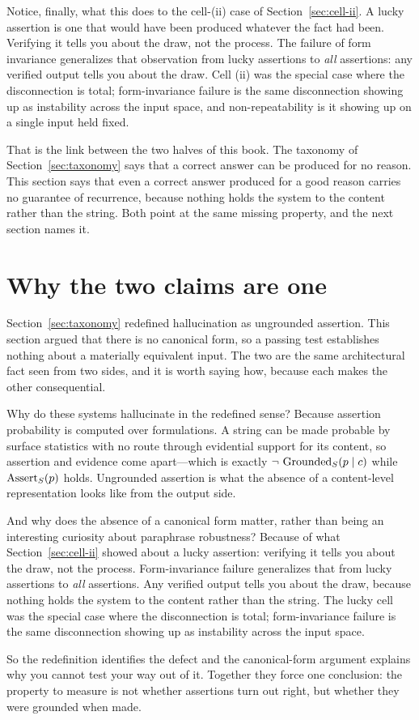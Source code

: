 Notice, finally, what this does to the cell-(ii) case of
Section~\ref{sec:cell-ii}. A lucky assertion is one that would have been produced
whatever the fact had been. Verifying it tells you about the draw, not the
process. The failure of form invariance generalizes that observation from lucky assertions to
\emph{all} assertions: any verified output tells you about the draw. Cell (ii) was
the special case where the disconnection is total; form-invariance failure is the
same disconnection showing up as instability across the input space, and
non-repeatability is it showing up on a single input held fixed.

That is the link between the two halves of this book. The taxonomy of
Section~\ref{sec:taxonomy} says that a correct answer can be produced for no
reason. This section says that even a correct answer produced for a good reason
carries no guarantee of recurrence, because nothing holds the system to the
content rather than the string. Both point at the same missing property, and the
next section names it.

\section{Why the two claims are one}
\label{sec:unity}

Section~\ref{sec:taxonomy} redefined hallucination as ungrounded assertion. This
section argued that there is no canonical form, so a passing test establishes
nothing about a materially equivalent input. The two are the same architectural
fact seen from two sides, and it is worth saying how, because each makes the other
consequential.

Why do these systems hallucinate in the redefined sense? Because assertion
probability is computed over formulations. A string can be made probable by surface
statistics with no route through evidential support for its content, so assertion
and evidence come apart---which is exactly $\neg\,\operatorname{Grounded}_S(p \mid c)$ while
$\operatorname{Assert}_S(p)$ holds. Ungrounded assertion is what the absence of a content-level
representation looks like from the output side.

And why does the absence of a canonical form matter, rather than being an
interesting curiosity about paraphrase robustness? Because of what
Section~\ref{sec:cell-ii} showed about a lucky assertion: verifying it tells you
about the draw, not the process. Form-invariance failure generalizes that from
lucky assertions to \emph{all} assertions. Any verified output tells you about the
draw, because nothing holds the system to the content rather than the string. The
lucky cell was the special case where the disconnection is total; form-invariance
failure is the same disconnection showing up as instability across the input space.

So the redefinition identifies the defect and the canonical-form argument explains
why you cannot test your way out of it. Together they force one conclusion: the property to measure is not whether assertions turn
out right, but whether they were grounded when made.
